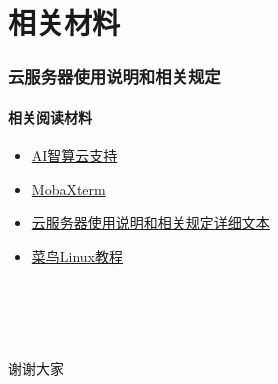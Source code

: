 \documentclass[10pt]{beamer}
\begin{document}
    \section{相关材料}
        \begin{frame}
            \frametitle{云服务器使用说明和相关规定}
                \framesubtitle{相关阅读材料}
                \begin{itemize}
                    \item \href{https://ai.blsc.cn/\#/support/info}{AI智算云支持} \\
                    \item \href{https://mobaxterm.mobatek.net}{MobaXterm} \\
                    \item \href{https://github.com/Ls-Dai/Cloud-Sever-Tutorial}{云服务器使用说明和相关规定详细文本} \\
                    \item \href{https://www.runoob.com/linux/linux-tutorial.html}{菜鸟Linux教程} \\
                \end{itemize}
                \hspace*{\fill} \\
                \hspace*{\fill} \\
                \hspace*{\fill} \\
                \hspace*{\fill} \\
                \centering
                {\huge 谢谢大家}
        \end{frame}
\end{document}
